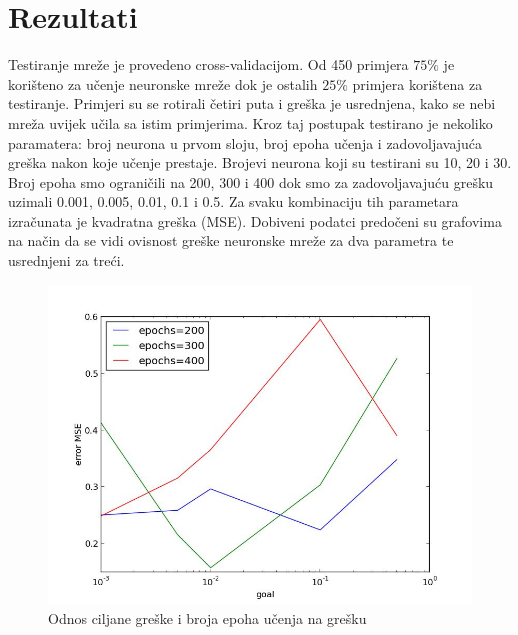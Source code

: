 \documentclass[a4paper,twocolumn]{article}
\begin{document}
\section{Rezultati}

Testiranje mreže je provedeno cross-validacijom. Od 450 primjera $75\%$ je
korišteno za učenje neuronske mreže dok je ostalih $25\%$ primjera korištena za
testiranje. Primjeri su se rotirali \v{c}etiri puta i gre\v{s}ka je usrednjena,
kako se nebi mreža uvijek učila sa istim primjerima. Kroz taj postupak
testirano je nekoliko paramatera: broj neurona u prvom sloju, broj epoha učenja
i zadovoljavajuća greška nakon koje učenje prestaje. Brojevi neurona koji su
testirani su 10, 20 i 30. Broj epoha smo ograničili na 200, 300 i 400 dok smo
za zadovoljavajuću grešku uzimali 0.001, 0.005, 0.01, 0.1 i 0.5. Za svaku
kombinaciju tih parametara izračunata je kvadratna greška (MSE). Dobiveni
podatci predočeni su grafovima na način da se vidi ovisnost greške neuronske
mreže za dva parametra te usrednjeni za tre\'ci.

\begin{figure}[htc]
    \centering
    \includegraphics[scale=0.25]{epochs.jpeg}
    \caption{Odnos ciljane gre\v{s}ke i broja epoha u\v{c}enja na gre\v{s}ku}
    \label{fig:epohe}
\end{figure}
\end{document}
